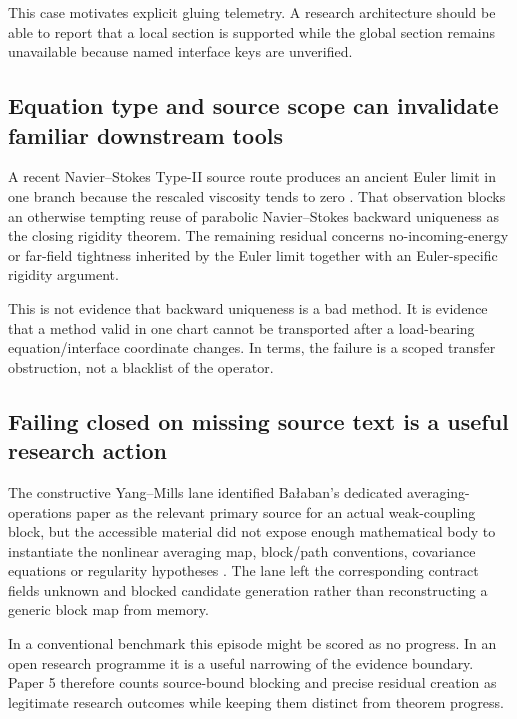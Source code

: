 This case motivates explicit gluing telemetry. A research architecture should be able to report that a local section is supported while the global section remains unavailable because named interface keys are unverified.

\subsection{Equation type and source scope can invalidate familiar downstream tools}

A recent Navier--Stokes Type-II source route produces an ancient Euler limit in one branch because the rescaled viscosity tends to zero \cite{raklmath_ns_b2a,seregin2026typeii}. That observation blocks an otherwise tempting reuse of parabolic Navier--Stokes backward uniqueness as the closing rigidity theorem. The remaining residual concerns no-incoming-energy or far-field tightness inherited by the Euler limit together with an Euler-specific rigidity argument.

This is not evidence that backward uniqueness is a bad method. It is evidence that a method valid in one chart cannot be transported after a load-bearing equation/interface coordinate changes. In \RAKL{} terms, the failure is a scoped transfer obstruction, not a blacklist of the operator.

\subsection{Failing closed on missing source text is a useful research action}

The constructive Yang--Mills lane identified Ba\l aban's dedicated averaging-operations paper as the relevant primary source for an actual weak-coupling block, but the accessible material did not expose enough mathematical body to instantiate the nonlinear averaging map, block/path conventions, covariance equations or regularity hypotheses \cite{raklmath_ym_balaban,balaban1985averaging}. The lane left the corresponding contract fields unknown and blocked candidate generation rather than reconstructing a generic block map from memory.

In a conventional benchmark this episode might be scored as no progress. In an open research programme it is a useful narrowing of the evidence boundary. Paper 5 therefore counts source-bound blocking and precise residual creation as legitimate research outcomes while keeping them distinct from theorem progress.

